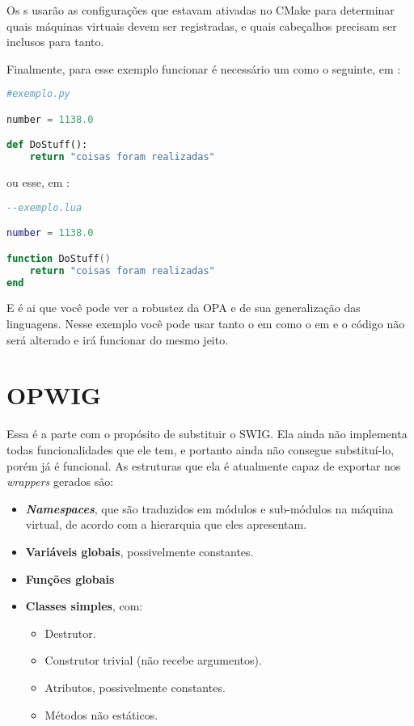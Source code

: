 Os s usarão as configurações que estavam ativadas no CMake para
determinar quais máquinas virtuais devem ser registradas, e quais cabeçalhos
precisam ser inclusos para tanto.

Finalmente, para esse exemplo funcionar é necessário um \script{} como o seguinte,
em :

\begin{lstlisting}[language=python]
#exemplo.py

number = 1138.0

def DoStuff():
    return "coisas foram realizadas"
\end{lstlisting}

ou esse, em :

\begin{lstlisting}[language=lua]
--exemplo.lua

number = 1138.0

function DoStuff()
    return "coisas foram realizadas"
end
\end{lstlisting}

E é ai que você pode ver a robustez da OPA e de sua generalização das linguagens.
Nesse exemplo você pode usar tanto o \script{} em  como o \script{} em
 e o código \CXX{} não será alterado e irá funcionar do mesmo jeito.

\section{OPWIG}
\label{sec:resultados:opwig}

Essa é a parte com o propósito de substituir o SWIG.
Ela ainda não implementa todas funcionalidades que ele tem, e portanto
ainda não consegue substituí-lo, porém já é funcional.
As estruturas \CXX{} que ela é atualmente capaz de exportar nos \textit{wrappers}
gerados são:

\begin{itemize}
  \item \textbf{\textit{Namespaces}}, que são traduzidos em módulos e sub-módulos
        na máquina virtual, de acordo com a hierarquia que eles apresentam.
  \item \textbf{Variáveis globais}, possivelmente constantes.
  \item \textbf{Funções globais}
  \item \textbf{Classes simples}, com:
    \begin{itemize}
      \item Destrutor.
      \item Construtor trivial (não recebe argumentos).
      \item Atributos, possivelmente constantes.
      \item Métodos não estáticos.
    \end{itemize}
\end{itemize}


